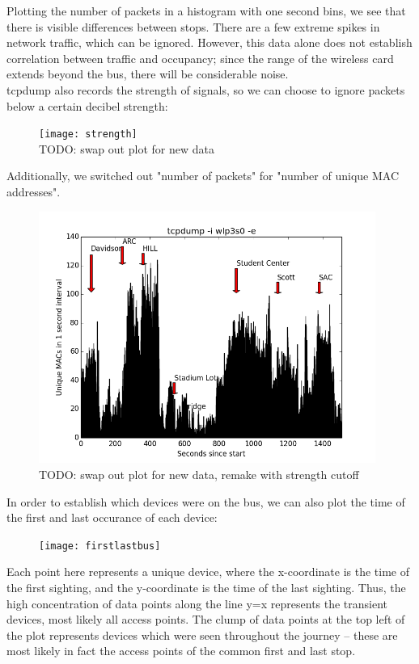 \documentclass[letterpaper]{scrartcl}
\begin{document}
	Plotting the number of packets in a histogram with one second bins, we see that there is visible differences between stops.
	There are a few extreme spikes in network traffic, which can be ignored.
	However, this data alone does not establish correlation between traffic and occupancy; since the range of the wireless card extends beyond the bus, there will be considerable noise.
	\\
	tcpdump also records the strength of signals, so we can choose to ignore packets below a certain decibel strength:

	\begin{figure}[H]
	\texttt{[image: strength]}
	\\TODO: swap out plot for new data
	\centering
	\end{figure}

	Additionally, we switched out "number of packets" for "number of unique MAC addresses".

	\begin{figure}[H]
	\includegraphics[width=11cm]{unique}
	\\TODO: swap out plot for new data, remake with strength cutoff
	\centering
	\end{figure}

	In order to establish which devices were on the bus, we can also plot the time of the first and last occurance of each device:


	\begin{figure}[H]
	\texttt{[image: firstlastbus]}
	\centering
	\end{figure}

	Each point here represents a unique device, where the x-coordinate is the time of the first sighting, and the y-coordinate is the time of the last sighting.
	Thus, the high concentration of data points along the line y=x represents the transient devices, most likely all access points.
	The clump of data points at the top left of the plot represents devices which were seen throughout the journey -- these are most likely in fact the access points of the common first and last stop.
	\\
\end{document}
